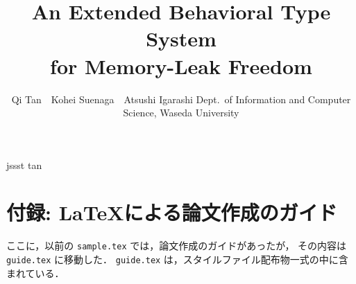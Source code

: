 \documentclass[T]{compsoft}
\begin{document}
\title{An Extended Behavioral Type System \\ for Memory-Leak Freedom}

%
\author{Qi Tan　Kohei Suenaga　Atsushi Igarashi
%
%
%
%
%
{Dept.\ of Information and Computer Science, Waseda University}}

\Jabstract{%
}

\Eabstract{
  
}
%
\maketitle \thispagestyle {empty}










 {jssst}
 {tan}

\appendix
\section{付録: \LaTeX による論文作成のガイド} 

ここに，以前の \verb|sample.tex| では，論文作成のガイドがあったが，
その内容は \verb|guide.tex| に移動した．
\verb|guide.tex| は，スタイルファイル配布物一式の中に含まれている．
\end{document}
